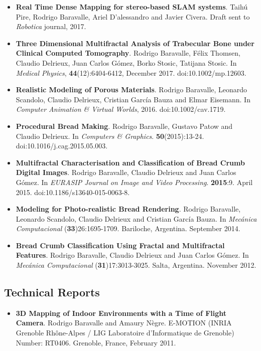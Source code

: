 \documentclass[a4paper,12pt]{article}
\begin{document}
\begin{itemize}
\item {\bf Real Time Dense Mapping for stereo-based SLAM systems}. Taihú Pire, Rodrigo Baravalle, Ariel D'alessandro and Javier Civera. Draft sent to {\it Robotica} journal, 2017.
\item {\bf Three Dimensional Multifractal Analysis of Trabecular Bone under Clinical Computed Tomography}. Rodrigo Baravalle, Félix Thomsen, Claudio Delrieux, Juan Carlos Gómez, Borko Stosic, Tatijana Stosic. In {\it Medical Physics}, {\bf 44}(12):6404-6412, December 2017. doi:10.1002/mp.12603.
\item {\bf Realistic Modeling of Porous Materials}. Rodrigo Baravalle, Leonardo Scandolo, Claudio Delrieux, Cristian García Bauza and Elmar Eisemann. In {\it Computer Animation \& Virtual Worlds}, 2016. doi:10.1002/cav.1719.
\item {\bf Procedural Bread Making}. Rodrigo Baravalle, Gustavo Patow and Claudio Delrieux. In {\it Computers \& Graphics}. {\bf 50}(2015):13-24. doi:10.1016/j.cag.2015.05.003.
\item {\bf Multifractal Characterisation and Classification of Bread Crumb Digital Images}. Rodrigo Baravalle, Claudio Delrieux and Juan Carlos Gómez. In {\it EURASIP Journal on Image and Video Processing}. {\bf 2015}:9. April 2015. doi:10.1186/s13640-015-0063-8.
\item {\bf Modeling for Photo-realistic Bread Rendering}. Rodrigo Baravalle, Leonardo Scandolo, Claudio Delrieux and Cristian García Bauza. In {\it Mecánica Computacional} ({\bf 33})26:1695-1709. Bariloche, Argentina. September 2014.
\item {\bf Bread Crumb Classification Using Fractal and Multifractal Features}. Rodrigo Baravalle, Claudio Delrieux and Juan Carlos G\'omez. In {\it Mecánica Computacional} ({\bf 31})17:3013-3025. Salta, Argentina. November 2012.
\end{itemize}

\subsection*{\color{niceblue} Technical Reports}
\begin{itemize}
\item {\bf 3D Mapping of Indoor Environments with a Time of Flight Camera}. Rodrigo Baravalle and Amaury N\`egre. E-MOTION (INRIA Grenoble Rh\^one-Alpes / LIG Laboratoire d'Informatique de Grenoble) Number: RT0406. Grenoble, France, February 2011.
\end{itemize}
\end{document}
